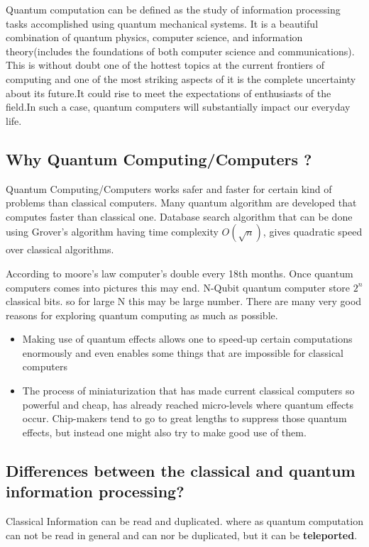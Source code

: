 \documentclass[11 pt]{article}
\theoremstyle{definition}
\theoremstyle{remark}
\begin{document}
Quantum computation can be defined as the study of information processing tasks accomplished using quantum mechanical systems. It is a beautiful combination of quantum physics, computer science, and information theory(includes the foundations of both computer science and communications). This is without doubt one of the hottest topics at the current frontiers of
computing and one of the most striking aspects of it is the complete uncertainty about its future.It could rise to meet the expectations of enthusiasts of the field.In such a case, quantum computers will substantially impact our everyday life.


\subsection{Why Quantum Computing/Computers ?}
Quantum Computing/Computers works safer and faster for certain kind of problems than classical computers. Many quantum algorithm are developed that computes faster than classical one. Database search algorithm that can be done using Grover's algorithm having time complexity $O(\sqrt{n})$, gives quadratic speed over classical algorithms.

According to moore's law computer's double every 18th months. Once quantum computers comes into pictures this may end. N-Qubit quantum computer store $2^n$ classical bits. so for large N this may be large number. There are many very good reasons for exploring quantum computing as much as possible.
\begin{itemize}
\item Making use of quantum effects allows one to speed-up certain computations enormously and even enables some things that are impossible for classical computers
\item The process of miniaturization that has made current classical computers so powerful and cheap, has already reached micro-levels where quantum effects occur. Chip-makers tend to go to great lengths to suppress those quantum effects, but instead one might also try to make good use of them.
\end{itemize}

\subsection{Differences between the classical and quantum information processing?}
Classical Information can be read and duplicated. where as quantum computation can not be read in general and can nor be duplicated, but it can be \textbf{teleported}.
\end{document}
